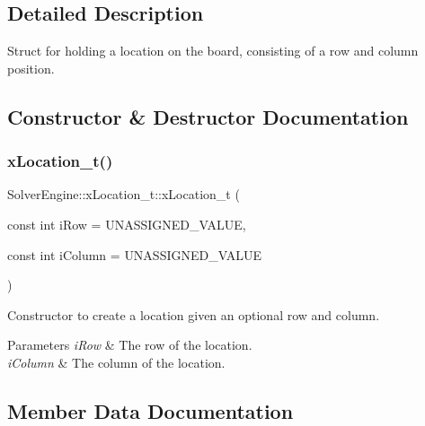 \subsection{Detailed Description}
Struct for holding a location on the board, consisting of a row and column position. 

\subsection{Constructor \& Destructor Documentation}
\mbox{\label{struct_solver_engine_1_1x_location__t_a7466ef246a603cfd998e4ea8cc51d9e5}} 
\subsubsection{\texorpdfstring{x\+Location\+\_\+t()}{xLocation\_t()}}
{\footnotesize\ttfamily Solver\+Engine\+::x\+Location\+\_\+t\+::x\+Location\+\_\+t (\begin{DoxyParamCaption}\item[{const int}]{i\+Row = {\ttfamily UNASSIGNED\+\_\+VALUE},  }\item[{const int}]{i\+Column = {\ttfamily UNASSIGNED\+\_\+VALUE} }\end{DoxyParamCaption})\hspace{0.3cm}{\ttfamily [inline]}}



Constructor to create a location given an optional row and column. 


\begin{DoxyParams}{Parameters}
{\em i\+Row} & The row of the location. \\
\hline
{\em i\+Column} & The column of the location. \\
\hline
\end{DoxyParams}


\subsection{Member Data Documentation}
\mbox{\label{struct_solver_engine_1_1x_location__t_ae6c026e4d241ddfdf65939513595578f}} 
